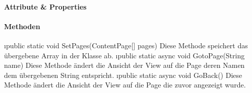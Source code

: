 \documentclass[../entwurf.tex]{subfiles}
\begin{document}
\paragraph{Attribute \& Properties}
\paragraph{Methoden}
\begin{itemize}
	\i{public static void SetPages(ContentPage[] pages)} Diese Methode speichert das übergebene Array in der Klasse ab.
	\i{public static async void GotoPage(String name)} Diese Methode ändert die Ansicht der View auf die Page deren Namen dem übergebenen String entspricht.
	\i{public static async void GoBack()} Diese Methode ändert die Ansicht der View auf die Page die zuvor angezeigt wurde.
\end{itemize}
\end{document}
